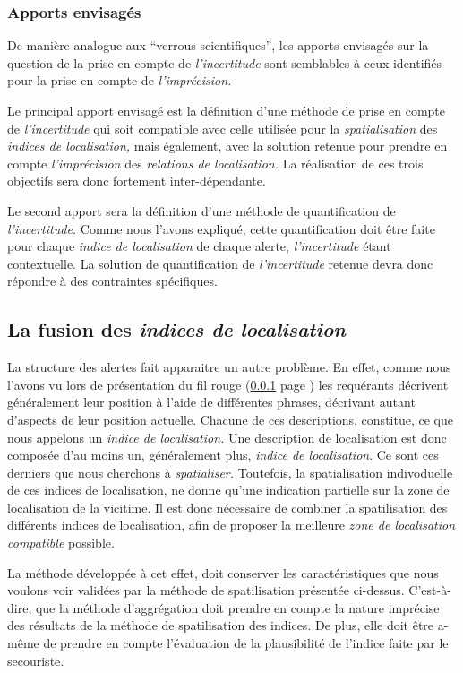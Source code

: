 \subsubsection{Apports envisagés}

De manière analogue aux \enquote{verrous scientifiques}, les apports
envisagés sur la question de la prise en compte de
\emph{l'incertitude} sont semblables à ceux identifiés pour la prise
en compte de \emph{l'imprécision.}

Le principal apport envisagé est la définition d'une méthode de prise
en compte de \emph{l'incertitude} qui soit compatible avec celle
utilisée pour la \emph{spatialisation} des \emph{indices de
  localisation,} mais également, avec la solution retenue pour prendre
en compte \emph{l'imprécision} des \emph{relations de localisation.}
La réalisation de ces trois objectifs sera donc fortement
inter-dépendante.

Le second apport sera la définition d'une méthode de quantification de
\emph{l'incertitude.} Comme nous l'avons expliqué, cette
quantification doit être faite pour chaque \emph{indice de
  localisation} de chaque alerte, \emph{l'incertitude} étant
contextuelle. La solution de quantification de \emph{l'incertitude}
retenue devra donc répondre à des contraintes spécifiques.

\subsection{La fusion des \emph{indices de localisation}}
\label{subsec:2-1-4}

La structure des alertes fait apparaitre un autre problème. En effet,
comme nous l'avons vu lors de présentation du fil rouge (\ref{} page
\pageref{}) les requérants décrivent généralement leur position à
l'aide de différentes phrases, décrivant autant d'aspects de leur
position actuelle. Chacune de ces descriptions, constitue, ce que nous
appelons un \emph{indice de localisation.} Une description de
localisation est donc composée d'au moins un, généralement plus,
\emph{indice de localisation}. Ce sont ces derniers que nous cherchons
à \emph{spatialiser.} Toutefois, la spatialisation indivoduelle de ces
indices de localisation, ne donne qu'une indication partielle sur la
zone de localisation de la vicitime. Il est donc nécessaire de
combiner la spatilisation des différents indices de localisation, afin
de proposer la meilleure \emph{zone de localisation compatible}
possible.

La méthode développée à cet effet, doit conserver les caractéristiques
que nous voulons voir validées par la méthode de spatilisation
présentée ci-dessus. C'est-à-dire, que la méthode d'aggrégation doit
prendre en compte la nature imprécise des résultats de la méthode de
spatilisation des indices. De plus, elle doit être a-même de prendre
en compte l'évaluation de la plausibilité de l'indice faite par le
secouriste.

